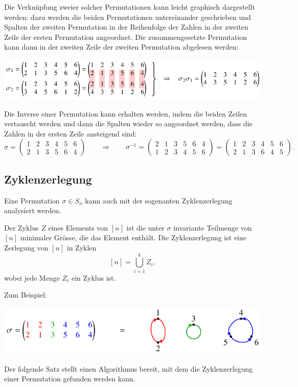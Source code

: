Die Verknüpfung zweier solcher Permutationen kann leicht graphisch
dargestellt werden: dazu werden die beiden Permutationen
untereinander geschrieben und Spalten der zweiten Permutation
in der Reihenfolge der Zahlen in der zweiten Zeile der ersten
Permutation angeordnet.
Die zusammengesetzte Permutation kann dann in der zweiten Zeile
der zweiten Permutation abgelesen werden:
\begin{center}
\includegraphics{chapters/50-permutationen/images/komposition.pdf}
\end{center}
Die Inverse einer Permutation kann erhalten werden, indem die beiden
Zeilen vertauscht werden und dann die Spalten wieder so angeordnet werden,
dass die Zahlen in der ersten Zeile ansteigend sind:
\[
\sigma = \begin{pmatrix}
1&2&3&4&5&6\\
2&1&3&5&6&4
\end{pmatrix}
\qquad\Rightarrow\qquad
\sigma^{-1}
=
\begin{pmatrix}
2&1&3&5&6&4\\
1&2&3&4&5&6
\end{pmatrix}
=
\begin{pmatrix}
1&2&3&4&5&6\\
2&1&3&6&4&5
\end{pmatrix}.
\]

\subsection{Zyklenzerlegung
\label{buch:subsection:zyklenzerlegung}}
Eine Permutation $\sigma\in S_n$ kann auch mit der sogenanten Zyklenzerlegung
%
analysiert werden.

\begin{definition}
Der Zyklus $Z$ eines Elements von $[n]$ ist die unter $\sigma$ invariante
Teilmenge von $[n]$ minimaler Grösse, die das Element enthält.
%
%
%
Die Zyklenzerlegung ist eine Zerlegung von $[n]$ in Zyklen
\[
[n]
=
\bigcup_{i=1}^k Z_i,
\]
wobei jede Menge $Z_i$ ein Zyklus ist.
\end{definition}

Zum Beispiel:
\begin{center}
\includegraphics{chapters/50-permutationen/images/zyklenzerlegung.pdf}
\end{center}
Der folgende Satz stellt einen Algorithmus bereit, mit dem die
Zyklenzerlegung einer Permutation gefunden werden kann.

